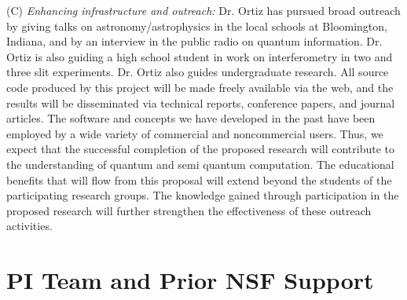 \documentclass{article}
\theoremstyle{remark}
\begin{document}
\medskip
\noindent (C) {\em Enhancing infrastructure and outreach:} Dr. Ortiz
has pursued broad outreach by giving talks on astronomy/astrophysics
in the local schools at Bloomington, Indiana, and by an interview in
the public radio on quantum information. Dr. Ortiz is also guiding a
high school student in work on interferometry in two and three slit
experiments. Dr. Ortiz also guides undergraduate research. All source
code produced by this project will be made freely available via the
web, and the results will be disseminated via technical reports,
conference papers, and journal articles.  The software and concepts we
have developed in the past have been employed by a wide variety of
commercial and noncommercial users.  Thus, we expect that the
successful completion of the proposed research will contribute to the
understanding of quantum and semi quantum computation. The educational
benefits that will flow from this proposal will extend beyond the
students of the participating research groups. The knowledge gained
through participation in the proposed research will further strengthen
the effectiveness of these outreach activities.

\section{PI Team and Prior NSF Support} 
\end{document}
